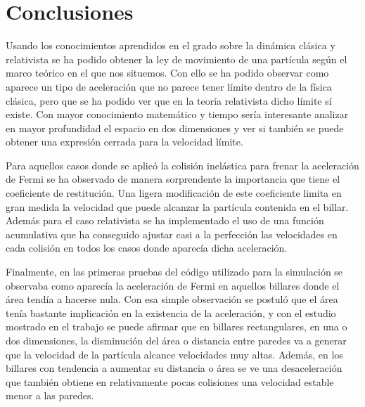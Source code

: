 %
%

\chapter{Conclusiones}

Usando los conocimientos aprendidos en el grado sobre la dinámica clásica y relativista se ha podido obtener la ley de movimiento de una partícula según el marco teórico en el que nos situemos. Con ello se ha podido observar como aparece un tipo de aceleración que no parece tener límite dentro de la física clásica, pero que se ha podido ver que en la teoría relativista dicho límite sí existe. Con mayor conocimiento matemático y tiempo sería interesante analizar en mayor profundidad el espacio en dos dimensiones y ver si también se puede obtener una expresión cerrada para la velocidad límite. 

\vspace{3mm}

Para aquellos casos donde se aplicó la colisión inelástica para frenar la aceleración de Fermi se ha observado de manera sorprendente la importancia que tiene el coeficiente de restitución. Una ligera modificación de este coeficiente limita en gran medida la velocidad que puede alcanzar la partícula contenida en el billar. Además para el caso relativista se ha implementado el uso de una función acumulativa que ha conseguido ajustar casi a la perfección las velocidades en cada colisión en todos los casos donde aparecía dicha aceleración.

\vspace{3mm}

Finalmente, en las primeras pruebas del código utilizado para la simulación se observaba como aparecía la aceleración de Fermi en aquellos billares donde el área tendía a hacerse nula. Con esa simple observación se postuló que el área tenía bastante implicación en la existencia de la aceleración, y con el estudio mostrado en el trabajo se puede afirmar que en billares rectangulares, en una o dos dimensiones, la disminución del área o distancia entre paredes va a generar que la velocidad de la partícula alcance velocidades muy altas. Además, en los billares con tendencia a aumentar su distancia o área se ve una desaceleración que también obtiene en relativamente pocas colisiones una velocidad estable menor a las paredes. 

%